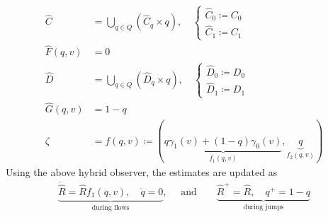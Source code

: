 \documentclass{article}
\newcommand{\SOthree}{\mathbb{SO}(3)}
\newcommand{\sothree}{\mathfrak{so}(3)}
\newcommand{\R}[1]{\mathbb{R}^{#1}}
\newcommand{\Omegay}{\Omega^y}
\newcommand{\brackets}[1]{\left(#1\right)}
\newcommand{\Rstar}{{R^*}}
\begin{document}

\begin{subequations}
\begin{align}
    \hat{C} &= \bigcup_{q\in Q}\brackets{\hat{C}_{q}\times q}, \quad \begin{cases}
        \hat{C}_{0} \coloneqq C_0\\
        \hat{C}_{1} \coloneqq C_1
    \end{cases}\\
    \hat{F}(q, v) &= 0\\
    \hat{D} &= \bigcup_{q\in Q} \brackets{\hat{D}_{q}\times q}, \quad \begin{cases}
        \hat{D}_{0} \coloneqq D_0\\
        \hat{D}_{1} \coloneqq D_1
    \end{cases}\\
    \hat{G}(q, v) &= 1 - q \\
    \zeta &= f(q,v)\coloneqq (\underbrace{q\gamma_1(v) + (1-q)\gamma_0(v)}_\text{$f_1(q, v)$}, \underbrace{q}_\text{$f_2(q,v)$}) \label{eq:hybrid-observer-ecf-output}
\end{align}
\end{subequations}
Using the above hybrid observer, the estimates are updated as 
\begin{align}\label{eq:hybrid_observer_ECF}
\underbrace{\dot{\hat{R}} = \hat{R}f_1(q, v), \quad \dot{q} = 0}_{\text{during flows}}, \quad \text{ and}\quad \quad   \underbrace{\hat{R}^+ = \hat{R}, \quad q^+ = 1 - q}_\text{during jumps}
\end{align}
\end{document}
